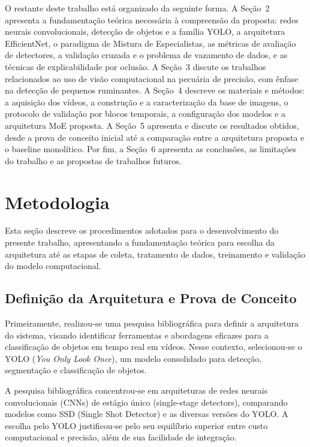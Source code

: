 \documentclass[12pt]{article}
\begin{document}
O restante deste trabalho está organizado da seguinte forma. A Seção~2 apresenta a fundamentação teórica necessária à compreensão da proposta: redes neurais convolucionais, detecção de objetos e a família YOLO, a arquitetura EfficientNet, o paradigma de Mistura de Especialistas, as métricas de avaliação de detectores, a validação cruzada e o problema de vazamento de dados, e as técnicas de explicabilidade por oclusão. A Seção~3 discute os trabalhos relacionados ao uso de visão computacional na pecuária de precisão, com ênfase na detecção de pequenos ruminantes. A Seção~4 descreve os materiais e métodos: a aquisição dos vídeos, a construção e a caracterização da base de imagens, o protocolo de validação por blocos temporais, a configuração dos modelos e a arquitetura MoE proposta. A Seção~5 apresenta e discute os resultados obtidos, desde a prova de conceito inicial até a comparação entre a arquitetura proposta e o baseline monolítico. Por fim, a Seção~6 apresenta as conclusões, as limitações do trabalho e as propostas de trabalhos futuros.

\section{Metodologia}

Esta seção descreve os procedimentos adotados para o desenvolvimento do presente trabalho, apresentando a fundamentação teórica para escolha da arquitetura até as etapas de coleta, tratamento de dados, treinamento e validação do modelo computacional.

\subsection{Definição da Arquitetura e Prova de Conceito}
Primeiramente, realizou-se uma pesquisa bibliográfica para definir a arquitetura do sistema, visando identificar ferramentas e abordagens eficazes para a classificação de objetos em tempo real em vídeos. Nesse contexto, selecionou-se o YOLO (\textit{You Only Look Once}), um modelo consolidado para detecção, segmentação e classificação de objetos.

A pesquisa bibliográfica concentrou-se em arquiteturas de redes neurais convolucionais (CNNs) de estágio único (single-stage detectors), comparando modelos como SSD (Single Shot Detector) e as diversas versões do YOLO. A escolha pelo YOLO justificou-se pelo seu equilíbrio superior entre custo computacional e precisão, além de sua facilidade de integração.
\end{document}
